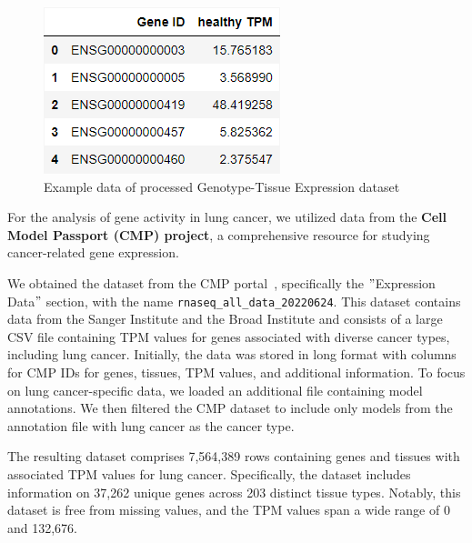 \begin{figure}[h]
    \centering
    \includegraphics[height=\dfheight]{figures/03_01_GTEX_healthy_mean}
    \caption{Example data of processed Genotype-Tissue Expression dataset}
    \label{fig:03_01_df_GTEX_healthy_mean}
\end{figure}




For the analysis of gene activity in lung cancer, we utilized data from the \textbf{Cell Model Passport (CMP) project},
a comprehensive resource for studying cancer-related gene expression.

We obtained the dataset from the CMP portal~\cite{cmp_download}, specifically the $"$Expression Data$"$ section,
with the name \texttt{rnaseq\_all\_data\_20220624}.
This dataset contains data from the Sanger Institute and the Broad Institute and
consists of a large CSV file containing TPM values for genes associated with diverse cancer types, including lung cancer.
Initially, the data was stored in long format with columns for CMP IDs for genes, tissues, TPM values, and additional information.
To focus on lung cancer-specific data, we loaded an additional file containing model annotations. \cite{cmp_tissue_models}
We then filtered the CMP dataset to include only models from the annotation file with lung cancer as the cancer type.

The resulting dataset comprises 7,564,389 rows containing genes and tissues with associated TPM values for lung cancer.
Specifically, the dataset includes information on 37,262 unique genes across 203 distinct tissue types.
Notably, this dataset is free from missing values, and the TPM values span a wide range of 0 and 132,676.

